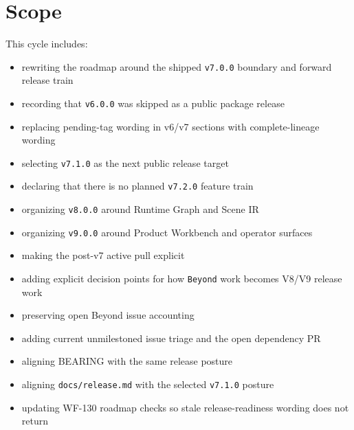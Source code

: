 \section{Scope}\label{record-213-scope}

This cycle includes:

\begin{itemize}
\tightlist
\item
  rewriting the roadmap around the shipped \texttt{v\allowbreak{}7\allowbreak{}.\allowbreak{}0\allowbreak{}.\allowbreak{}0} boundary and forward release train
\item
  recording that \texttt{v\allowbreak{}6\allowbreak{}.\allowbreak{}0\allowbreak{}.\allowbreak{}0} was skipped as a public package release
\item
  replacing pending-tag wording in v6/v7 sections with complete-lineage wording
\item
  selecting \texttt{v\allowbreak{}7\allowbreak{}.\allowbreak{}1\allowbreak{}.\allowbreak{}0} as the next public release target
\item
  declaring that there is no planned \texttt{v\allowbreak{}7\allowbreak{}.\allowbreak{}2\allowbreak{}.\allowbreak{}0} feature train
\item
  organizing \texttt{v\allowbreak{}8\allowbreak{}.\allowbreak{}0\allowbreak{}.\allowbreak{}0} around Runtime Graph and Scene IR
\item
  organizing \texttt{v\allowbreak{}9\allowbreak{}.\allowbreak{}0\allowbreak{}.\allowbreak{}0} around Product Workbench and operator surfaces
\item
  making the post-v7 active pull explicit
\item
  adding explicit decision points for how \texttt{B\allowbreak{}e\allowbreak{}y\allowbreak{}o\allowbreak{}n\allowbreak{}d} work becomes V8/V9 release work
\item
  preserving open Beyond issue accounting
\item
  adding current unmilestoned issue triage and the open dependency PR
\item
  aligning BEARING with the same release posture
\item
  aligning \texttt{d\allowbreak{}o\allowbreak{}c\allowbreak{}s\allowbreak{}/\allowbreak{}r\allowbreak{}e\allowbreak{}l\allowbreak{}e\allowbreak{}a\allowbreak{}s\allowbreak{}e\allowbreak{}.\allowbreak{}m\allowbreak{}d} with the selected \texttt{v\allowbreak{}7\allowbreak{}.\allowbreak{}1\allowbreak{}.\allowbreak{}0} posture
\item
  updating WF-130 roadmap checks so stale release-readiness wording does not return
\end{itemize}

